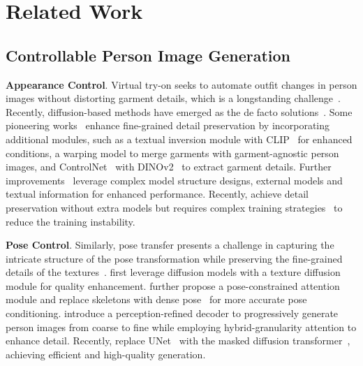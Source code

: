 \section{Related Work}
\label{leffa:sec:related_work}

\subsection{Controllable Person Image Generation}

\noindent \textbf{Appearance Control}.
Virtual try-on seeks to automate outfit changes in person images without distorting garment details, which is a longstanding challenge~\citep{yang2020towards, choi2021viton, ge2021disentangled, ge2021parser, he2022style}.
Recently, diffusion-based methods have emerged as the de facto solutions~\citep{zhu2023tryondiffusion, kim2024stableviton, xu2024ootdiffusion, wan2024improving, shen2024imagdressing}.
Some pioneering works~\citep{morelli2023ladi, gou2023taming, zeng2024cat}
enhance fine-grained detail preservation by incorporating additional modules, such as a textual inversion module with CLIP~\citep{radford2021learning} for enhanced conditions, a warping model to merge garments with garment-agnostic person images, and ControlNet~\citep{zhang2023adding} with DINOv2~\citep{oquab2023dinov2} to extract garment details.
Further improvements~\citep{kim2024stableviton, choi2024improving, xu2024ootdiffusion, wan2024improving} leverage complex model structure designs, external models and textual information for enhanced performance.
Recently, \citet{chong2024catvton} achieve detail preservation without extra models but requires complex training strategies~\citep{zhou2024dream} to reduce the training instability.

\noindent \textbf{Pose Control}.
Similarly, pose transfer presents a challenge in capturing the intricate structure of the pose transformation while preserving the fine-grained details of the textures~\citep{ma2017pose, siarohin2018deformable, li2019dense, zhu2019progressive, ren2020deep, men2020controllable, zhang2021pise, albahar2021pose, zhou2021cocosnet, sanyal2021learning, zhang2022exploring, zhou2022cross, ren2022neural, shen2023advancing, shen2024imagpose}. 
\citet{bhunia2023person} first leverage diffusion models with a texture diffusion module for quality enhancement.
\citet{han2023controllable} further propose a pose-constrained attention module and replace skeletons with dense pose~\citep{guler2018densepose} for more accurate pose conditioning.
\citet{lu2024coarse} introduce a perception-refined decoder to progressively generate person images from coarse to fine while employing hybrid-granularity attention to enhance detail.
Recently, \citet{pham2024cross} replace UNet~\citep{ronneberger2015u} with the masked diffusion transformer~\citep{peebles2023scalable, gao2023masked}, achieving efficient and high-quality generation.

